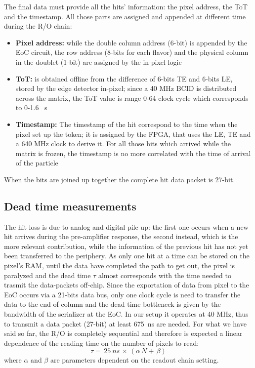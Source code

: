     The final data must provide all the hits' information: the pixel address, the ToT and the timestamp. All those parts are assigned and appended at different time during the R/O chain:  
    \begin{itemize}
        \item\textbf{Pixel address:} while the double column address (6-bit) is appended by the EoC circuit, the row address (8-bits for each flavor) and the physical column in the doublet (1-bit) are assigned by the in-pixel logic      
        \item \textbf{ToT:} is obtained offline from the difference of 6-bits TE and 6-bits LE, stored by the edge detector in-pixel; since a 40 MHz BCID is distributed across the matrix, the ToT value is range 0-64 clock cycle which corresponds to 0-1.6 \si{\mu s}  
        \item \textbf{Timestamp:} The timestamp of the hit correspond to the time when the pixel set up the token; it is assigned by the FPGA, that uses the LE, TE and a 640 MHz clock to derive it. For all those hits which arrived while the matrix is frozen, the timestamp is no more correlated with the time of arrival of the particle         
    \end{itemize}
    When the bits are joined up together the complete hit data packet is 27-bit. 

    \subsection{Dead time measurements}
        The hit loss is due to analog and digital pile up: the first one occurs when a new hit arrives during the pre-amplifier response, the second instead, which is the more relevant contribution, while the information of the previous hit has not yet been transferred to the periphery.  
        As only one hit at a time can be stored on the pixel's RAM, until the data have completed the path to get out, the pixel is paralyzed and the dead time $\tau$ almost corresponds with the time needed to trasmit the data-packets off-chip.
        Since the exportation of data from pixel to the EoC occurs via a 21-bits data bus, only one clock cycle is need to transfer the data to the end of column and the dead time bottleneck is given by the bandwidth of the serializer at the EoC. In our setup it operates at 40 MHz, thus to transmit a data packet (27-bit) at least \SI{675}{ns} are needed. 
        For what we have said so far, the R/O is completely sequential and therefore is expected a linear dependence of the reading time on the number of pixels to read:
        \begin{equation}
            \tau =\, 25\: \unit{ns}\, \times\, (\alpha\, N +\, \beta)
            \label{eq:reading_time}
        \end{equation}
        where $\alpha$ and $\beta$ are parameters dependent on the readout chain setting. 
        
